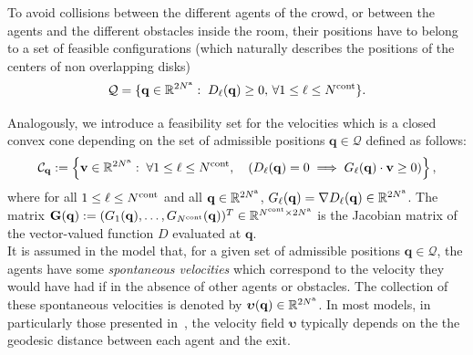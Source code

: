 To avoid collisions between the different agents of the crowd, or between the agents and the different obstacles inside the room, their positions have to belong to a set of feasible configurations (which naturally describes the positions of the centers of non overlapping disks) 
\begin{equation}
    \mathcal{Q}=\{\mathbf{q} \in \mathbb{R}^{2 N^{\rm a}} : \;  D_{\ell}(\mathbf{q}) \geq 0, \, \forall 1 \leq \ell \leq N^{\rm cont}\}.
    \label{eq:pos_feasibility}
\end{equation}

\medskip

Analogously, we introduce a feasibility set for the velocities which is a closed convex cone depending on the set of admissible positions $\mathbf{q} \in \mathcal{Q}$ defined as follows:
 \begin{equation}
     \mathcal{C}_{\mathbf{q}}:=\left\{\mathbf{v} \in \mathbb{R}^{2N^{\rm a}}: \;  \forall 1\leq \ell \leq N^{\rm cont}, \quad \left(D_{\ell}(\mathbf{q})=0 \implies G_{\ell}(\mathbf{q}) \cdot \mathbf{v} \geq 0\right)\right\},
     \label{eq:vel_cone}
 \end{equation}
where for all $1\leq \ell \leq N^{\rm cont}$ and all $\mathbf{q} \in  \mathbb{R}^{2 N^{\rm a}}$, $G_{\ell}(\mathbf{q})=\nabla D_{\ell}(\mathbf{q})\in \mathbb{R}^{2N^{\rm a}}$. The matrix $\mathbf{G}(\mathbf{q}) := (G_1(\mathbf{q}) , \ldots , G_{N^{\rm cont}}(\mathbf{q}))^T \in \mathbb{R}^{N^{\rm cont} \times 2N^{\rm a}}$ is the Jacobian matrix of the vector-valued function $D$ evaluated at $\mathbf{q}$. \\
It is assumed in the model that, for a given set of admissible positions $\mathbf{q} \in \mathcal Q$, the agents have some \emph{spontaneous velocities} which correspond to the velocity they would have had if in the absence of other agents or obstacles. The collection of these spontaneous velocities is denoted by $\boldsymbol{\upsilon}(\mathbf{q})\in \mathbb{R}^{2N^{\rm a}}$. In most models, in particularly those presented in~\cite{maury2011discrete}, the velocity field $\boldsymbol{\upsilon}$ typically depends on the the geodesic distance between each agent and the exit.

\bigskip


